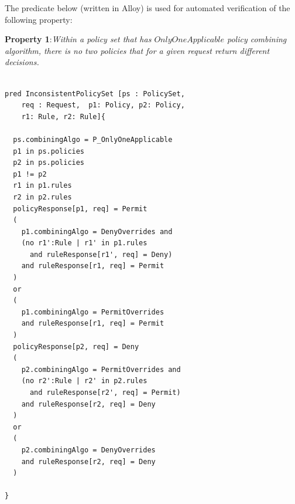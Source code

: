 \documentclass[letterpaper]{acm_proc_article-sp}
\begin{document}
The predicate below (written in Alloy) is used for automated verification of the following property:

\textbf{Property 1}:\textit{Within a policy set that has $OnlyOneApplicable$ policy combining algorithm, there is no two policies that for a given request return different decisions.}

\begin{verbatim}

pred InconsistentPolicySet [ps : PolicySet, 
    req : Request,  p1: Policy, p2: Policy, 
    r1: Rule, r2: Rule]{

  ps.combiningAlgo = P_OnlyOneApplicable 
  p1 in ps.policies
  p2 in ps.policies
  p1 != p2
  r1 in p1.rules
  r2 in p2.rules
  policyResponse[p1, req] = Permit
  (
    p1.combiningAlgo = DenyOverrides and
    (no r1':Rule | r1' in p1.rules 
      and ruleResponse[r1', req] = Deny)
    and ruleResponse[r1, req] = Permit
  )
  or
  (
    p1.combiningAlgo = PermitOverrides
    and ruleResponse[r1, req] = Permit
  )
  policyResponse[p2, req] = Deny
  (
    p2.combiningAlgo = PermitOverrides and
    (no r2':Rule | r2' in p2.rules 
      and ruleResponse[r2', req] = Permit)
    and ruleResponse[r2, req] = Deny
  )
  or
  (
    p2.combiningAlgo = DenyOverrides
    and ruleResponse[r2, req] = Deny
  )

}

\end{verbatim}



\balancecolumns
\end{document}
